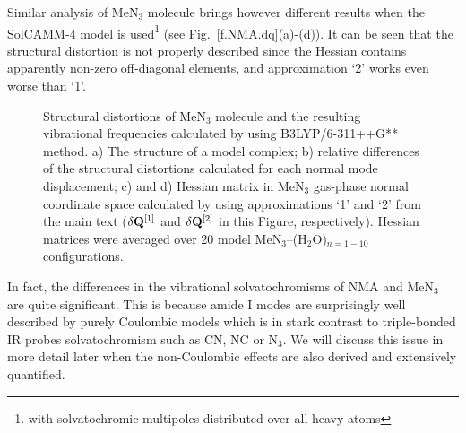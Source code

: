 \documentclass[b5paper,oneside,fleqn,11pt]{book}
\begin{document}
\begin{refsection}
Similar analysis of MeN$_3$ molecule brings however different results when the Sol\-CAMM-4 model is
used\footnote{with solvatochromic multipoles distributed over all heavy atoms} 
(see Fig.~\ref{f.NMA.dq}(a)-(d)). It can be seen that
the structural distortion is not properly described since the Hessian contains apparently
non\hyp{}zero off\hyp{}diagonal elements, and approximation `2' works even worse than `1'. 
%
\begin{figure}[ht]
\centering
\setlength\fboxsep{0.4pt}
\setlength\fboxrule{0.5pt}
\caption{Structural distortions of MeN$_3$ molecule and the resulting vibrational
frequencies calculated by using B3LYP/6-311++G** method. 
a) The structure of a model complex; b) relative differences of the
structural distortions
calculated for each normal mode displacement; c) and d) Hessian matrix in MeN$_3$ gas-phase normal coordinate
space calculated by using approximations `1' and `2' from the main text 
($\delta {\bf Q}^{[1]}$ and $\delta {\bf Q}^{[2]}$ in this Figure, respectively).
Hessian matrices were averaged over 20 model MeN$_3$--(H$_2$O)$_{n=1-10}$ configurations.
\label{f.MeN3.dq}}
\end{figure}
%

In fact, the differences in the vibrational solvatochromisms of NMA and MeN$_3$ are quite significant. 
This is because amide I modes are surprisingly well described by purely Coulombic 
models \citep{Blasiak.Lee.Cho.JCP.2013,Blasiak.Cho.JCP.2014,Blasiak.Cho.JCP.2015}
which is in stark contrast to triple\hyp{}bonded IR probes solvatochromism such as 
CN, NC or N$_3$. \citep{Blasiak.Ritchie.Webb.Cho.PCCP.2016,Maj.Ahn.Blasiak.Kwak.Han.Cho.XXX.2016}
We will discuss this issue in more detail later when the non-Coulombic effects 
are also derived and extensively quantified.


\end{refsection}
\end{document}
